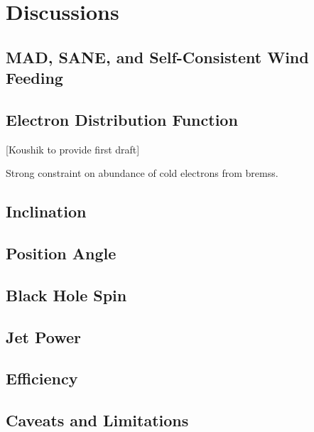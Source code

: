 \section{Discussions}\label{sec:discussions}


\subsection{MAD, SANE, and Self-Consistent Wind Feeding}


\subsection{Electron Distribution Function}

[Koushik to provide first draft]

Strong constraint on abundance of cold electrons from bremss.   

\subsection{Inclination}

\subsection{Position Angle}

\subsection{Black Hole Spin}

\subsection{Jet Power}

\subsection{Efficiency}

\subsection{Caveats and Limitations}

